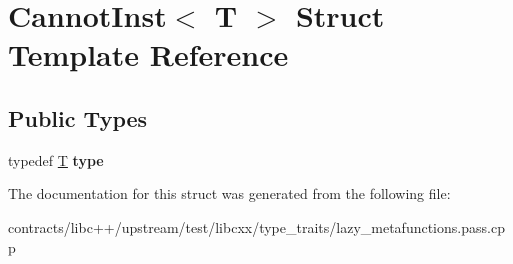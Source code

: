 \hypertarget{struct_cannot_inst}{}\section{Cannot\+Inst$<$ T $>$ Struct Template Reference}
\label{struct_cannot_inst}
\subsection*{Public Types}
\begin{DoxyCompactItemize}
\item 
\mbox{\label{struct_cannot_inst_a0d8b55c7af2874f4aa9f7fb3bca1bdfb}} 
typedef \mbox{\hyperlink{struct_t}{T}} {\bfseries type}
\end{DoxyCompactItemize}


The documentation for this struct was generated from the following file\+:\begin{DoxyCompactItemize}
\item 
contracts/libc++/upstream/test/libcxx/type\+\_\+traits/lazy\+\_\+metafunctions.\+pass.\+cpp\end{DoxyCompactItemize}
